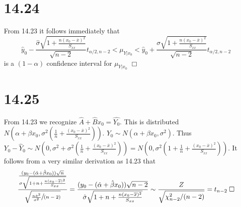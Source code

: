 \documentclass{article}
\begin{document}
\section*{14.24}
From 14.23 it follows immediately that
$$\hat{y}_0 - \frac{\hat{\sigma} \sqrt{1+\frac{n(x_0-\overline{x})^2}{S_{xx}}}}{\sqrt{n-2}}t_{\alpha/2,n-2} < \mu_{Y|x_0} < \hat{y}_0 + \frac{\hat{\sigma} \sqrt{1+\frac{n(x_0-\overline{x})^2}{S_{xx}}}}{\sqrt{n-2}}t_{\alpha/2,n-2}$$
is a $(1-\alpha)$ confidence interval for $\mu_{Y|x_0}$ $\Box$

\section*{14.25}
From 14.23 we recognize $\hat{A} + \hat{B}x_0 = \hat{Y_0}$. This is distributed $N(\alpha+\beta x_0, \sigma^2\left(\frac{1}{n} + \frac{(x_0-\overline{x})^2}{S_{xx}}\right))$. $Y_0 \sim N(\alpha + \beta x_0, \sigma^2)$. Thus $Y_0 - \hat{Y}_0 \sim N(0, \sigma^2 + \sigma^2\left(\frac{1}{n} + \frac{(x_0-\overline{x})^2}{S_{xx}}\right)) = N(0, \sigma^2\left(1 + \frac{1}{n} + \frac{(x_0-\overline{x})^2}{S_{xx}}\right))$. It follows from a very similar derivation as 14.23 that
$$\frac{\frac{(y_0-(\hat{\alpha}+\hat{\beta}x_0))\sqrt{n}}{\sigma \sqrt{1 + n +\frac{n(x_0-\overline{x})^2}{S_{xx}}}}}{\sqrt{\sfrac{\frac{n\hat{\sigma}^2}{\sigma^2}}{(n-2)}}} = \frac{(y_0-(\hat{\alpha}+\hat{\beta}x_0))\sqrt{n-2}}{\hat{\sigma} \sqrt{1+n+\frac{n(x_0-\overline{x})^2}{S_{xx}}}} \sim \frac{Z}{\sqrt{\chi^2_{n-2}/(n-2)}} = t_{n-2} \; \Box$$
\end{document}
